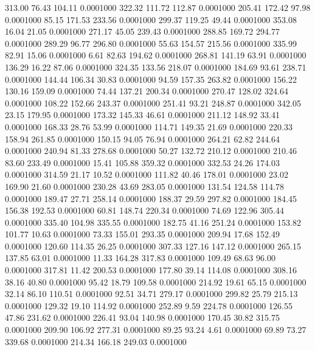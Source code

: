  313.00   76.43  104.11   0.0001000
 322.32  111.72  112.87   0.0001000
 205.41  172.42   97.98   0.0001000
  85.15  171.53  233.56   0.0001000
 299.37  119.25   49.44   0.0001000
 353.08   16.04   21.05   0.0001000
 271.17   45.05  239.43   0.0001000
 288.85  169.72  294.77   0.0001000
 289.29   96.77  296.80   0.0001000
  55.63  154.57  215.56   0.0001000
 335.99   82.91   15.06   0.0001000
   6.61   82.63  194.62   0.0001000
 268.81  141.19   63.91   0.0001000
 136.29   16.22   87.06   0.0001000
 324.35  133.56  218.07   0.0001000
 184.69   93.61  238.71   0.0001000
 144.44  106.34   30.83   0.0001000
  94.59  157.35  263.82   0.0001000
 156.22  130.16  159.09   0.0001000
  74.44  137.21  200.34   0.0001000
 270.47  128.02  324.64   0.0001000
 108.22  152.66  243.37   0.0001000
 251.41   93.21  248.87   0.0001000
 342.05   23.15  179.95   0.0001000
 173.32  145.33   46.61   0.0001000
 211.12  148.92   33.41   0.0001000
 168.33   28.76   53.99   0.0001000
 114.71  149.35   21.69   0.0001000
 220.33  158.94  261.85   0.0001000
 150.15   94.05   76.94   0.0001000
 264.21   62.82  244.64   0.0001000
 240.94   81.33  278.68   0.0001000
  50.27  132.72  210.12   0.0001000
 210.46   83.60  233.49   0.0001000
  15.41  105.88  359.32   0.0001000
 332.53   24.26  174.03   0.0001000
 314.59   21.17   10.52   0.0001000
 111.82   40.46  178.01   0.0001000
  23.02  169.90   21.60   0.0001000
 230.28   43.69  283.05   0.0001000
 131.54  124.58  114.78   0.0001000
 189.47   27.71  258.14   0.0001000
 188.37   29.59  297.82   0.0001000
 184.45  156.38  192.53   0.0001000
  60.81  148.74  220.34   0.0001000
  74.69  122.96  305.44   0.0001000
 335.40  104.98  335.55   0.0001000
 182.75   41.16  251.24   0.0001000
 153.82  101.77   10.63   0.0001000
  73.33  155.01  293.35   0.0001000
 209.94   17.68  152.49   0.0001000
 120.60  114.35   26.25   0.0001000
 307.33  127.16  147.12   0.0001000
 265.15  137.85   63.01   0.0001000
  11.33  164.28  317.83   0.0001000
 109.49   68.63   96.00   0.0001000
 317.81   11.42  200.53   0.0001000
 177.80   39.14  114.08   0.0001000
 308.16   38.16   40.80   0.0001000
  95.42   18.79  109.58   0.0001000
 214.92   19.61   65.15   0.0001000
  32.14   86.10  110.51   0.0001000
  92.51   34.71  279.17   0.0001000
 299.82   25.79  215.13   0.0001000
 129.32   19.10  114.92   0.0001000
 252.89    9.59  224.78   0.0001000
 126.55   47.86  231.62   0.0001000
 226.41   93.04  140.98   0.0001000
 170.45   30.82  315.75   0.0001000
 209.90  106.92  277.31   0.0001000
  89.25   93.24    4.61   0.0001000
  69.89   73.27  339.68   0.0001000
 214.34  166.18  249.03   0.0001000
